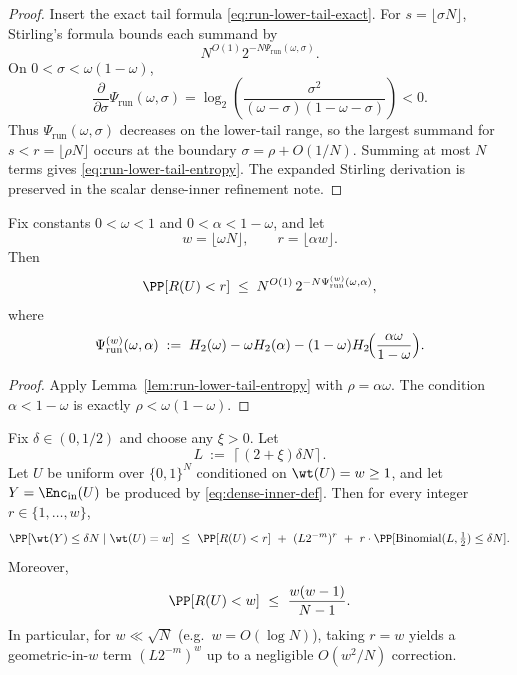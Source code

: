 \begin{proof}
Insert the exact tail formula \eqref{eq:run-lower-tail-exact}.  For \(s=\lfloor\sigma N\rfloor\), Stirling's formula
bounds each summand by
\[
N^{O(1)}2^{-N\Psi_{\mathrm{run}}(\omega,\sigma)}.
\]
On \(0<\sigma<\omega(1-\omega)\),
\[
\frac{\partial}{\partial\sigma}\Psi_{\mathrm{run}}(\omega,\sigma)
=
\log_2\!\left(\frac{\sigma^2}{(\omega-\sigma)(1-\omega-\sigma)}\right)<0.
\]
Thus \(\Psi_{\mathrm{run}}(\omega,\sigma)\) decreases on the lower-tail range, so the largest summand for
\(s<r=\lfloor\rho N\rfloor\) occurs at the boundary \(\sigma=\rho+O(1/N)\).  Summing at most \(N\) terms gives
\eqref{eq:run-lower-tail-entropy}.  The expanded Stirling derivation is preserved in the scalar dense-inner refinement
note.
\end{proof}

\begin{corollary}
\label{cor:run-lower-tail-alpha}
Fix constants \(0<\omega<1\) and \(0<\alpha<1-\omega\), and let
\[
w=\lfloor \omega N\rfloor,
\qquad
r=\lfloor \alpha w\rfloor.
\]
Then
\begin{equation}
\label{eq:run-lower-tail-alpha}
\PP[R(U)<r]
\;\le\;
N^{O(1)}\,2^{-N\Psi_{\mathrm{run}}^{(w)}(\omega,\alpha)},
\end{equation}
where
\begin{equation}
\label{eq:run-rate-function-alpha}
\Psi_{\mathrm{run}}^{(w)}(\omega,\alpha)
\;:=\;
H_2(\omega)
- \omega H_2(\alpha)
- (1-\omega)H_2\!\Bigl(\frac{\alpha\omega}{1-\omega}\Bigr).
\end{equation}
\end{corollary}

\begin{proof}
Apply Lemma~\ref{lem:run-lower-tail-entropy} with \(\rho=\alpha\omega\).
The condition \(\alpha<1-\omega\) is exactly \(\rho<\omega(1-\omega)\).
\end{proof}

\begin{lemma}
\label{lem:dense-forced-termination}
Fix $\delta\in(0,1/2)$ and choose any $\xi>0$. Let
\[
L\ :=\ \left\lceil (2+\xi)\delta N \right\rceil.
\]
Let $U$ be uniform over $\{0,1\}^N$ conditioned on $\wt(U)=w\ge 1$, and let $Y=\Enc_{\mathrm{in}}(U)$ be produced by
\eqref{eq:dense-inner-def}. Then for every integer $r\in\{1,\dots,w\}$,
\begin{equation}
\label{eq:dense-forced-termination}
\PP[\wt(Y)\le \delta N \mid \wt(U)=w]
\ \le\
\PP[R(U)<r]\ +\ (L2^{-m})^{r}\ +\ r\cdot \PP[\mathrm{Binomial}(L,\tfrac12)\le \delta N].
\end{equation}
Moreover,
\begin{equation}
\label{eq:runs-adjacent-bound}
\PP[R(U)<w]\ \le\ \frac{w(w-1)}{N-1}.
\end{equation}
In particular, for $w\ll \sqrt{N}$ (e.g.\ $w=O(\log N)$), taking $r=w$ yields a geometric-in-$w$ term
$(L2^{-m})^w$ up to a negligible $O(w^2/N)$ correction.
\end{lemma}

